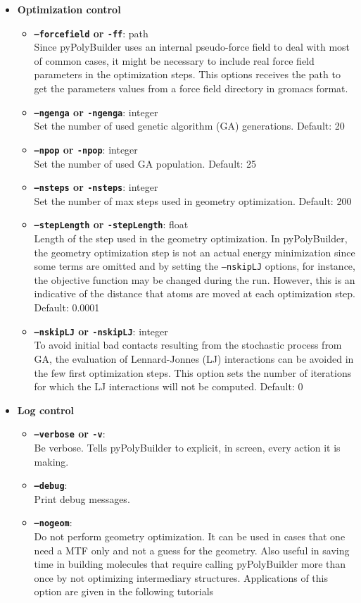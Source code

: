 \documentclass[12pt]{article}
\begin{document}
\begin{itemize}
  \item \textbf{Optimization control}
\begin{itemize}
  \item \textbf{\texttt{--forcefield} or \texttt{-ff}}: path\\
    Since pyPolyBuilder uses an internal pseudo-force field to deal with most of common cases, it might be necessary to include real force field parameters in the optimization steps. This options receives the path to get the parameters values from a force field directory in gromacs format.
  \item \textbf{\texttt{--ngenga} or \texttt{-ngenga}}: integer\\
    Set the number of used genetic algorithm (GA) generations. Default: 20
  \item \textbf{\texttt{--npop} or \texttt{-npop}}: integer\\
    Set the number of used GA population. Default: 25
  \item \textbf{\texttt{--nsteps} or \texttt{-nsteps}}: integer\\
    Set the number of max steps used in geometry optimization. Default: 200
  \item \textbf{\texttt{--stepLength} or \texttt{-stepLength}}: float\\
    Length of the step used in the geometry optimization. In pyPolyBuilder, the geometry optimization step is not an actual energy minimization since some terms are omitted and by setting the \texttt{--nskipLJ} options, for instance, the objective function may be changed during the run. However, this is an indicative of the distance that atoms are moved at each optimization step. Default: 0.0001
  \item \textbf{\texttt{--nskipLJ} or \texttt{-nskipLJ}}: integer\\
    To avoid initial bad contacts resulting from the stochastic process from GA, the evaluation of Lennard-Jonnes (LJ) interactions can be avoided in the few first optimization steps. This option sets the number of iterations for which the LJ interactions will not be computed. Default: 0
\end{itemize}

  \item \textbf{Log control}
\begin{itemize}
  \item \textbf{\texttt{--verbose} or \texttt{-v}}:\\
    Be verbose. Tells pyPolyBuilder to explicit, in screen, every action it is making.
  \item \textbf{\texttt{--debug}}:\\
    Print debug messages.
  \item \textbf{\texttt{--nogeom}}:\\
    Do not perform geometry optimization. It can be used in cases that one need a MTF only and not a guess for the geometry. Also useful in saving time in building molecules that require calling pyPolyBuilder more than once by not optimizing intermediary structures. Applications of this option are given in the following tutorials
\end{itemize}


\end{itemize}
\end{document}
